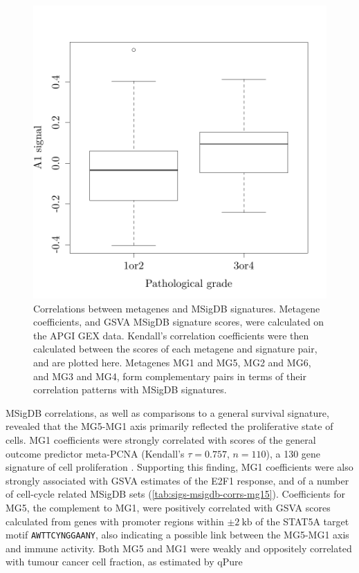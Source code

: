 \documentclass[dissertation.tex]{subfiles}
\begin{document}
\begin{figure}
\centering
\includegraphics[width=.7\linewidth]{analysis/biosurv/reports/18_SIS_diag_dsd_final/figure/nmf-msigdb-cor-plots-1}
\caption{Correlations between metagenes and \acrshort{MSigDB} signatures.  Metagene coefficients, and \acrshort{GSVA} \acrshort{MSigDB} signature scores, were calculated on the \acrshort{APGI} \acrshort{GEX} data.  Kendall's correlation coefficients were then calculated between the scores of each metagene and signature pair, and are plotted here.  Metagenes MG1 and MG5, MG2 and MG6, and MG3 and MG4, form complementary pairs in terms of their correlation patterns with \acrshort{MSigDB} signatures.\label{fig:sigs-nmf-corplots}}
\end{figure}

\gls{MSigDB} correlations, as well as comparisons to a general survival signature, revealed that the MG5-MG1 axis primarily reflected the proliferative state of cells.  MG1 coefficients were strongly correlated with scores of the general outcome predictor meta-PCNA (Kendall's $\tau = 0.757$, $n = 110$), a 130 gene signature of cell proliferation \cite{Venet2011}.  Supporting this finding, MG1 coefficients were also strongly associated with \gls{GSVA} estimates of the E2F1 response, and of a number of cell-cycle related \gls{MSigDB} sets (\cref{tab:sigs-msigdb-corrs-mg15}).  Coefficients for MG5, the complement to MG1, were positively correlated with \gls{GSVA} scores calculated from genes with promoter regions within $\pm 2\ \text{kb}$ of the STAT5A target motif \texttt{AWTTCYNGGAANY}, also indicating a possible link between the MG5-MG1 axis and immune activity.  Both MG5 and MG1 were weakly and oppositely correlated with tumour cancer cell fraction, as estimated by qPure \cite{Song2012}
\end{document}
